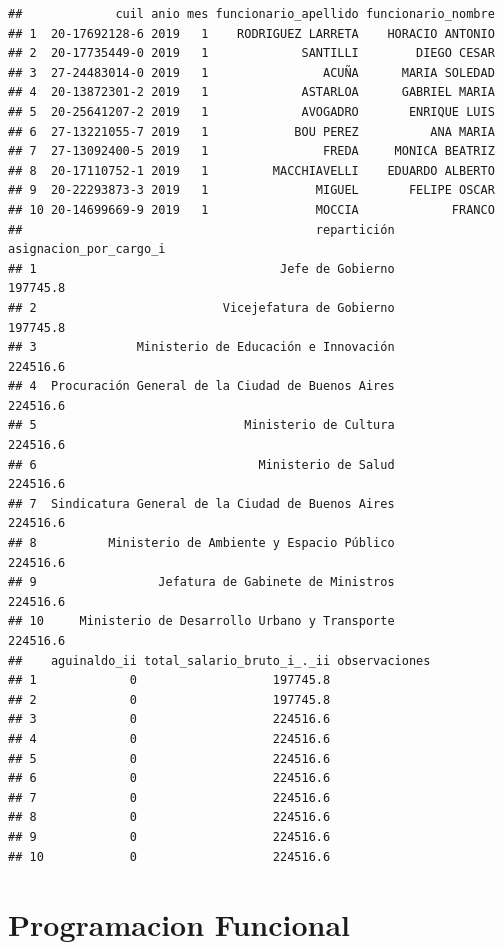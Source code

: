 \documentclass[]{book}
\begin{document}
\begin{verbatim}
##             cuil anio mes funcionario_apellido funcionario_nombre
## 1  20-17692128-6 2019   1    RODRIGUEZ LARRETA    HORACIO ANTONIO
## 2  20-17735449-0 2019   1             SANTILLI        DIEGO CESAR
## 3  27-24483014-0 2019   1                ACUÑA      MARIA SOLEDAD
## 4  20-13872301-2 2019   1             ASTARLOA      GABRIEL MARIA
## 5  20-25641207-2 2019   1             AVOGADRO       ENRIQUE LUIS
## 6  27-13221055-7 2019   1            BOU PEREZ          ANA MARIA
## 7  27-13092400-5 2019   1                FREDA     MONICA BEATRIZ
## 8  20-17110752-1 2019   1         MACCHIAVELLI    EDUARDO ALBERTO
## 9  20-22293873-3 2019   1               MIGUEL       FELIPE OSCAR
## 10 20-14699669-9 2019   1               MOCCIA             FRANCO
##                                         repartición asignacion_por_cargo_i
## 1                                  Jefe de Gobierno               197745.8
## 2                          Vicejefatura de Gobierno               197745.8
## 3              Ministerio de Educación e Innovación               224516.6
## 4  Procuración General de la Ciudad de Buenos Aires               224516.6
## 5                             Ministerio de Cultura               224516.6
## 6                               Ministerio de Salud               224516.6
## 7  Sindicatura General de la Ciudad de Buenos Aires               224516.6
## 8          Ministerio de Ambiente y Espacio Público               224516.6
## 9                 Jefatura de Gabinete de Ministros               224516.6
## 10     Ministerio de Desarrollo Urbano y Transporte               224516.6
##    aguinaldo_ii total_salario_bruto_i_._ii observaciones
## 1             0                   197745.8              
## 2             0                   197745.8              
## 3             0                   224516.6              
## 4             0                   224516.6              
## 5             0                   224516.6              
## 6             0                   224516.6              
## 7             0                   224516.6              
## 8             0                   224516.6              
## 9             0                   224516.6              
## 10            0                   224516.6
\end{verbatim}

\hypertarget{programacion-funcional}{%
\chapter{Programacion Funcional}\label{programacion-funcional}}
\end{document}
